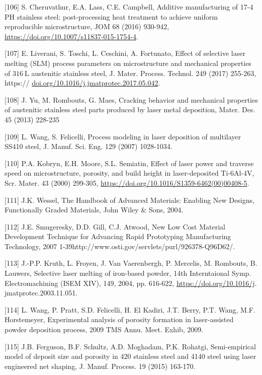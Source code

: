 \documentclass[10pt]{article}
\begin{document}
[106] S. Cheruvathur, E.A. Lass, C.E. Campbell, Additive manufacturing of 17-4 PH stainless steel: post-processing heat treatment to achieve uniform reproducible microstructure, JOM 68 (2016) 930-942, \href{https://doi.org/10.1007/s11837-015-1754-4}{https://doi.org/10.1007/s11837-015-1754-4}.

[107] E. Liverani, S. Toschi, L. Ceschini, A. Fortunato, Effect of selective laser melting (SLM) process parameters on microstructure and mechanical properties of $316 \mathrm{~L}$ austenitic stainless steel, J. Mater. Process. Technol. 249 (2017) 255-263, https:// \href{http://doi.org/10.1016/j.jmatprotec.2017.05.042}{doi.org/10.1016/j.jmatprotec.2017.05.042}.

[108] J. Yu, M. Rombouts, G. Maes, Cracking behavior and mechanical properties of austenitic stainless steel parts produced by laser metal deposition, Mater. Des. 45 (2013) 228-235

[109] L. Wang, S. Felicelli, Process modeling in laser deposition of multilayer SS410 steel, J. Manuf. Sci. Eng. 129 (2007) 1028-1034.

[110] P.A. Kobryn, E.H. Moore, S.L. Semiatin, Effect of laser power and traverse speed on microstructure, porosity, and build height in laser-deposited Ti-6Al-4V, Scr. Mater. 43 (2000) 299-305, \href{https://doi.org/10.1016/S1359-6462(00)00408-5}{https://doi.org/10.1016/S1359-6462(00)00408-5}.

[111] J.K. Wessel, The Handbook of Advanced Materials: Enabling New Designs, Functionally Graded Materials, John Wiley \& Sons, 2004.

[112] J.E. Smugeresky, D.D. Gill, C.J. Atwood, New Low Cost Material Development Technique for Advancing Rapid Prototyping Manufacturing Technology, 2007 1-39http://www.osti.gov/servlets/purl/926378-Q96D62/.

[113] J.-P.P. Kruth, L. Froyen, J. Van Vaerenbergh, P. Mercelis, M. Rombouts, B. Lauwers, Selective laser melting of iron-based powder, 14th Interntaional Symp. Electromachining (ISEM XIV), 149, 2004, pp. 616-622, \href{https://doi.org/10.1016/j}{https://doi.org/10.1016/j}. jmatprotec.2003.11.051.

[114] L. Wang, P. Pratt, S.D. Felicelli, H. El Kadiri, J.T. Berry, P.T. Wang, M.F. Horstemeyer, Experimental analysis of porosity formation in laser-assisted powder deposition process, 2009 TMS Annu. Meet. Exhib, 2009.

[115] J.B. Ferguson, B.F. Schultz, A.D. Moghadam, P.K. Rohatgi, Semi-empirical model of deposit size and porosity in 420 stainless steel and 4140 steel using laser engineered net shaping, J. Manuf. Process. 19 (2015) 163-170.
\end{document}
